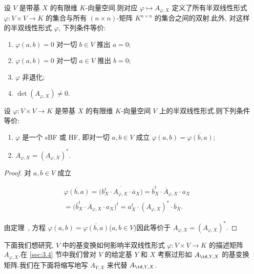 \begin{corollary}\label{cor:7.3.3}
设 $V$ 是带基 $X$ 的有限维 $K$-向量空间.则对应 $\varphi \longmapsto A_{\varphi, X}$ 定义了所有半双线性形式 $\varphi \colon V \times V \longrightarrow K$ 的集合与所有 $(n \times n)$-矩阵 $K^{n \times n}$ 的集合之间的双射.此外, 对这样的半双线性形式 $\varphi$, 下列条件等价:
\begin{enumerate}
\item[(i)] $\varphi(a, b) = 0$ 对一切 $b \in V$ 推出 $a = 0$;
\item[(ii)] $\varphi(a, b) = 0$ 对一切 $a \in V$ 推出 $b = 0$;
\item[(iii)] $\varphi$ 非退化;
\item[(iv)] $\det(A_{\varphi, X}) \neq 0$.
\end{enumerate}
\end{corollary}

\begin{corollary}\label{cor:7.3.4}
设 $\varphi \colon V \times V \longrightarrow K$ 是带基 $X$ 的有限维 $K$-向量空间 $V$ 上的半双线性形式.则下列条件等价:
\begin{enumerate}
\item[(i)] $\varphi$ 是一个 sBF 或 HF, 即对一切 $a, b \in V$ 成立 $\varphi(a, b) = \overline{\varphi(b, a)}$;
\item[(ii)] $A_{\varphi, X} = (A_{\varphi, X})^{*}$.
\end{enumerate}
\end{corollary}

\begin{proof}
对 $a, b \in V$ 成立

\[
\begin{array}{c}
\overline{\varphi(b, a)} = \overline{\bigl(b_X^{t} \cdot A_{\varphi, X} \cdot \overline{a}_X\bigr)} = \overline{b}_X^{t} \cdot \overline{A}_{\varphi, X} \cdot a_X \\
= \bigl(\overline{b}_X^{t} \cdot \overline{A}_{\varphi, X} \cdot a_X\bigr)^{t} = a_X^{t} \cdot (A_{\varphi, X})^{*} \cdot \overline{b}_X\text{.}
\end{array}
\]

由定理~, 方程 $\varphi(a, b) = \overline{\varphi(b, a)}$($a, b \in V$)因此等价于 $A_{\varphi, X} = (A_{\varphi, X})^{*}$.
\end{proof}

下面我们想研究, $V$ 中的基变换如何影响半双线性形式 $\varphi \colon V \times V \longrightarrow K$ 的描述矩阵 $A_{\varphi, X}$.在 \ref{sec:3.4} 节中我们曾对 $V$ 的给定基 $Y$ 和 $X$ 考察过形如 $A_{\id, Y, X}$ 的基变换矩阵.我们在下面将缩写地写 $A_{Y, X}$ 来代替 $A_{\id, Y, X}$.

